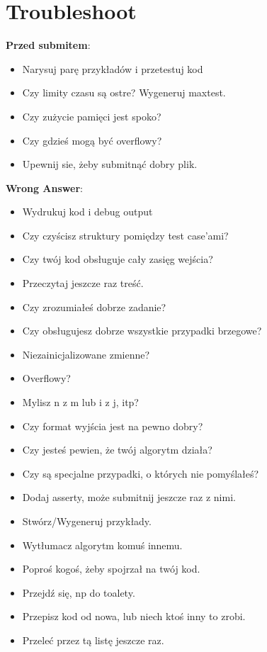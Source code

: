 \section{Troubleshoot}
\footnotesize{
\textbf{Przed submitem}:
\begin{itemize}
	\item Narysuj parę przykładów i przetestuj kod
	\item Czy limity czasu są ostre? Wygeneruj maxtest.
	\item Czy zużycie pamięci jest spoko?
	\item Czy gdzieś mogą być overflowy? 
	\item Upewnij sie, żeby submitnąć dobry plik.
\end{itemize}

\textbf{Wrong Answer}:
\begin{itemize}
	\item Wydrukuj kod i debug output
	\item Czy czyścisz struktury pomiędzy test case'ami?
	\item Czy twój kod obsługuje cały zasięg wejścia?
	\item Przeczytaj jeszcze raz treść.
	\item Czy zrozumiałeś dobrze zadanie?
	\item Czy obsługujesz dobrze wszystkie przypadki brzegowe?
	\item Niezainicjalizowane zmienne?
	\item Overflowy?
	\item Mylisz n z m lub i z j, itp?
	\item Czy format wyjścia jest na pewno dobry?
	\item Czy jesteś pewien, że twój algorytm działa?
	\item Czy są specjalne przypadki, o których nie pomyślałeś?
	\item Dodaj asserty, może submitnij jeszcze raz z nimi.
	\item Stwórz/Wygeneruj przykłady.
	\item Wytłumacz algorytm komuś innemu.
	\item Poproś kogoś, żeby spojrzał na twój kod.
	\item Przejdź się, np do toalety.
	\item Przepisz kod od nowa, lub niech ktoś inny to zrobi.
	\item Przeleć przez tą listę jeszcze raz.
\end{itemize}

}
